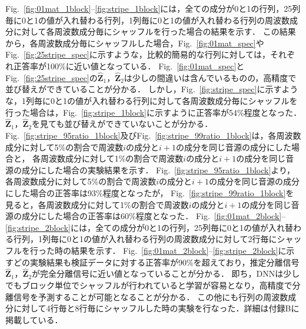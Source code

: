 Fig.~\ref{fig:01mat_1block}--\ref{fig:stripe_1block}には，全ての成分が0と1の行列，25列毎に0と1の値が入れ替わる行列，1列毎に0と1の値が入れ替わる行列の周波数成分に対して各周波数成分毎にシャッフルを行った場合の結果を示す．
この結果から，各周波数成分毎にシャッフルした場合，Fig.~\ref{fig:01mat_spec}やFig.~\ref{fig:25stripe_spec}に示すような，比較的簡易的な行列に対しては，それぞれ正答率が100\%に近い値となっている．
Fig.~\ref{fig:01mat_spec}とFig.~\ref{fig:25stripe_spec}の$\hat{\bm{Z}}_1$，$\hat{\bm{Z}}_2$は少しの間違いは含んでいるものの，高精度で並び替えができていることが分かる．
しかし，Fig.~\ref{fig:stripe_spec}に示すような，1列毎に0と1の値が入れ替わる行列に対して各周波数成分毎にシャッフルを行った場合は，Fig.~\ref{fig:stripe_1block}に示すように正答率が54\%程度となった．
$\hat{\bm{Z}}_1$，$\hat{\bm{Z}}_2$を見ても並び替えができていないことが分かる．
Fig.~\ref{fig:stripe_95ratio_1block}及びFig.~\ref{fig:stripe_99ratio_1block}は，各周波数成分に対して5\%の割合で周波数$i$の成分と$i+1$の成分を同じ音源の成分にした場合と，
各周波数成分に対して1\%の割合で周波数$i$の成分と$i+1$の成分を同じ音源の成分にした場合の実験結果を示す．
Fig.~\ref{fig:stripe_95ratio_1block}より，各周波数成分に対して5\%の割合で周波数$i$の成分と$i+1$の成分を同じ音源の成分にした場合の正答率は93\%程度となったが，
Fig.~\ref{fig:stripe_99ratio_1block}を見ると，各周波数成分に対して1\%の割合で周波数$i$の成分と$i+1$の成分を同じ音源の成分にした場合の正答率は60\%程度となった．
Fig.~\ref{fig:01mat_2block}--\ref{fig:stripe_2block}には，全ての成分が0と1の行列，25列毎に0と1の値が入れ替わる行列，1列毎に0と1の値が入れ替わる行列の周波数成分に対して2行毎にシャッフルを行った時の結果を示す．
Fig.~\ref{fig:01mat_2block}--\ref{fig:stripe_2block}に示すどの実験結果も検証データに対する正答率が90\%を超えており，推定分離信号$\hat{\bm{Z}}_1$，$\hat{\bm{Z}}_2$が完全分離信号に近い値となっていることが分かる．
即ち，DNNは少しでもブロック単位でシャッフルが行われていると学習が容易となり，高精度で分離信号を予測することが可能となることが分かる．
この他にも行列の周波数成分に対して4行毎と8行毎にシャッフルした時の実験を行なった．詳細は付録Bに掲載している．

